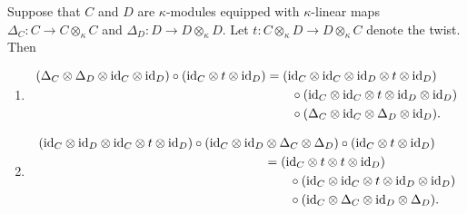 \begin{lem}\label{lem:tt1}
    Suppose that\/ $C$ and\/ $D$ are\/ $\kappa$-modules equipped with\/ $\kappa$-linear maps\/ $\Delta_C\colon C\to C\otimes_\kappa C$ and\/ $\Delta_D\colon D\to D\otimes_\kappa D$. Let\/ $t\colon C\otimes_\kappa D\to D\otimes_\kappa C$ denote the twist. Then
    \begin{enumerate}[\rm i)]
    \item 
    \small
    \begin{align*}
        (\Delta_C\otimes\Delta_D\otimes\text{\rm id}_C\otimes\text{\rm id}_D)
            \circ(\text{\rm id}_C\otimes t\otimes\text{\rm id}_D)
        &= (\text{\rm id}_C\otimes\text{\rm id}_C\otimes\text{\rm id}_D\otimes t\otimes\text{\rm id}_D)\\
        &\qquad\circ(\text{\rm id}_C\otimes\text{\rm id}_C\otimes t\otimes\text{\rm id}_D\otimes\text{\rm id}_D)\\
        &\qquad\circ(\Delta_C\otimes\text{\rm id}_C\otimes\Delta_D\otimes\text{\rm id}_D).
    \end{align*}
    \item 
    \small
    \begin{align*}
    (\text{\rm id}_C\otimes\text{\rm id}_D\otimes\text{\rm id}_C\otimes t\otimes\text{\rm id}_D)
            \circ(\text{\rm id}_C\otimes\text{\rm id}_D&\otimes\Delta_C\otimes\Delta_D)
            \circ(\text{\rm id}_C\otimes t\otimes\text{\rm id}_D)\\
        &= (\text{\rm id}_C\otimes t\otimes t\otimes\text{\rm id}_D)\\
        &\qquad\circ(\text{\rm id}_C\otimes\text{\rm id}_C\otimes t\otimes\text{\rm id}_D\otimes\text{\rm id}_D)\\
        &\qquad\circ(\text{\rm id}_C\otimes\Delta_C\otimes\text{\rm id}_D\otimes\Delta_D).
    \end{align*}
    \normalsize
    \end{enumerate}
\end{lem}

